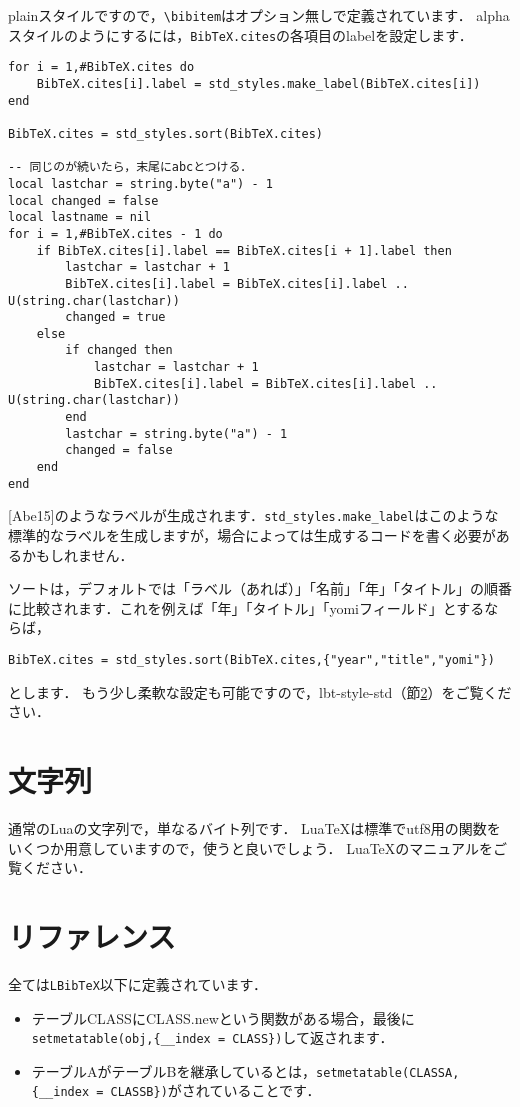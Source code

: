 \documentclass[a4paper]{ltjsarticle}
\newcommand{\LuaTeX}{Lua\TeX}
\begin{document}
plainスタイルですので，\verb|\bibitem|はオプション無しで定義されています．
alphaスタイルのようにするには，\verb|BibTeX.cites|の各項目のlabelを設定します．
\begin{lstlisting}
for i = 1,#BibTeX.cites do
	BibTeX.cites[i].label = std_styles.make_label(BibTeX.cites[i])
end

BibTeX.cites = std_styles.sort(BibTeX.cites)

-- 同じのが続いたら，末尾にabcとつける．
local lastchar = string.byte("a") - 1
local changed = false
local lastname = nil
for i = 1,#BibTeX.cites - 1 do
	if BibTeX.cites[i].label == BibTeX.cites[i + 1].label then
		lastchar = lastchar + 1
		BibTeX.cites[i].label = BibTeX.cites[i].label .. U(string.char(lastchar))
		changed = true
	else
		if changed then
			lastchar = lastchar + 1
			BibTeX.cites[i].label = BibTeX.cites[i].label .. U(string.char(lastchar))
		end
		lastchar = string.byte("a") - 1
		changed = false
	end
end

\end{lstlisting}
[Abe15]のようなラベルが生成されます．\verb|std_styles.make_label|はこのような標準的なラベルを生成しますが，場合によっては生成するコードを書く必要があるかもしれません．

ソートは，デフォルトでは「ラベル（あれば）」「名前」「年」「タイトル」の順番に比較されます．これを例えば「年」「タイトル」「yomiフィールド」とするならば，
\begin{lstlisting}
BibTeX.cites = std_styles.sort(BibTeX.cites,{"year","title","yomi"})
\end{lstlisting}
とします．
もう少し柔軟な設定も可能ですので，lbt-style-std（節\ref{}）をご覧ください．

\section{文字列}
通常のLuaの文字列で，単なるバイト列です．
\LuaTeX は標準でutf8用の関数をいくつか用意していますので，使うと良いでしょう．
\LuaTeX のマニュアルをご覧ください．

\section{リファレンス}
全ては\verb|LBibTeX|以下に定義されています．
\begin{itemize}
\item テーブルCLASSにCLASS.newという関数がある場合，最後に\verb|setmetatable(obj,{__index = CLASS})|して返されます．
\item テーブルAがテーブルBを継承しているとは，\verb|setmetatable(CLASSA,{__index = CLASSB})|がされていることです．
\end{itemize}
\end{document}

